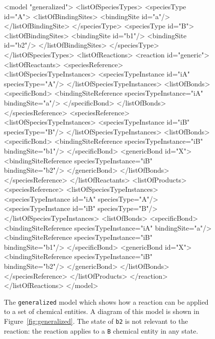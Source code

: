 \documentclass{cekarticle}
\begin{document}
\begin{figure}[h]
\begin{example}
<model "generalized">
    <listOfSpeciesTypes>
        <speciesType id="A">
            <listOfBindingSites>
                <bindingSite id="a"/>
            </listOfBindingSite>
        </speciesType>
        <speciesType id="B">
            <listOfBindingSites>
                <bindingSite id="b1"/>
                <bindingSite id="b2"/>
            </listOfBindingSites>
        </speciesType>
    </listOfSpeciesTypes>
    <listOfReactions>
        <reaction id="generic">
            <listOfReactants>
                <speciesReference>
                    <listOfSpeciesTypeInstances>
                        <speciesTypeInstance id="iA" speciesType="A"/>
                    </listOfSpeciesTypeInstances>
                    <listOfBonds>
                        <specificBond>
                            <bindingSiteReference speciesTypeInstance="iA" bindingSite="a"/>
                        </specificBond>
                    </listOfBonds>
                </speciesReference>
                <speciesReference>
                    <listOfSpeciesTypeInstances>
                        <speciesTypeInstance id="iB" speciesType="B"/>
                    </listOfSpeciesTypeInstances>
                    <listOfBonds>
                        <specificBond>
                            <bindingSiteReference speciesTypeInstance="iB" bindingSite="b1"/>
                        </specificBond>
                        <genericBond id="X">
                            <bindingSiteReference speciesTypeInstance="iB" bindingSite="b2"/>
                        </genericBond>
                    </listOfBonds>
                </speciesReference>
            </listOfReactants>
            <listOfProducts>
                <speciesReference>
                    <listOfSpeciesTypeInstances>
                        <speciesTypeInstance id="iA" speciesType="A"/>
                        <speciesTypeInstance id="iB" speciesType="B"/>
                    </listOfSpeciesTypeInstances>
                    <listOfBonds>
                        <specificBond>
                            <bindingSiteReference speciesTypeInstance="iA" bindingSite="a"/>
                            <bindingSiteReference speciesTypeInstance="iB" bindingSite="b1"/>
                        </specificBond>
                        <genericBond id="X">
                            <bindingSiteReference speciesTypeInstance="iB" bindingSite="b2"/>
                        </genericBond>
                    </listOfBonds>
                </speciesReference>
            </listOfProducts>
        </reaction>
    </listOfReactions>
</model>
\end{example}
  \caption{The \texttt{generalized} model which shows how a reaction can be applied to a set
  of chemical entities. A diagram of this model is shown in Figure~\ref{fig:generalized}.  The state of
   \texttt{b2} is not relevant to the reaction:
  the reaction applies to a \texttt{B} chemical entity in any
  state.}
  \label{fig:generalized-xml}
\end{figure}
\end{document}
